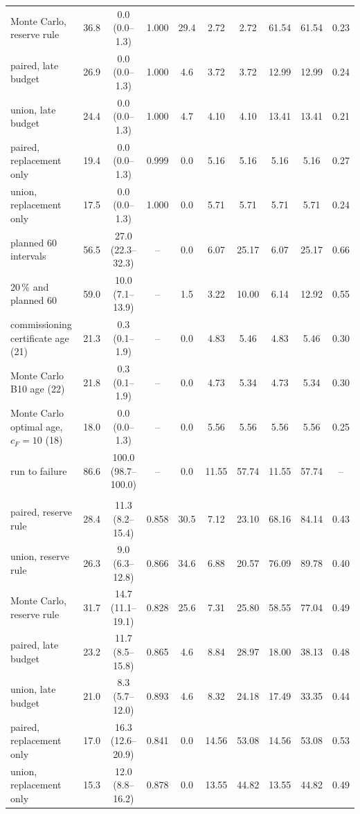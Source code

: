 \begin{table}[htbp]
\begin{tabular*}{\textwidth}{@{\extracolsep{\fill}}lccccccccc@{}}
Monte Carlo, reserve rule & 36.8 & 0.0 (0.0--1.3) & 1.000 & 29.4 & 2.72 & 2.72 & 61.54 & 61.54 & 0.23 \\
paired, late budget & 26.9 & 0.0 (0.0--1.3) & 1.000 & 4.6 & 3.72 & 3.72 & 12.99 & 12.99 & 0.24 \\
union, late budget & 24.4 & 0.0 (0.0--1.3) & 1.000 & 4.7 & 4.10 & 4.10 & 13.41 & 13.41 & 0.21 \\
paired, replacement only & 19.4 & 0.0 (0.0--1.3) & 0.999 & 0.0 & 5.16 & 5.16 & 5.16 & 5.16 & 0.27 \\
union, replacement only & 17.5 & 0.0 (0.0--1.3) & 1.000 & 0.0 & 5.71 & 5.71 & 5.71 & 5.71 & 0.24 \\
planned 60 intervals & 56.5 & 27.0 (22.3--32.3) & -- & 0.0 & 6.07 & 25.17 & 6.07 & 25.17 & 0.66 \\
20\,\% and planned 60 & 59.0 & 10.0 (7.1--13.9) & -- & 1.5 & 3.22 & 10.00 & 6.14 & 12.92 & 0.55 \\
commissioning certificate age (21) & 21.3 & 0.3 (0.1--1.9) & -- & 0.0 & 4.83 & 5.46 & 4.83 & 5.46 & 0.30 \\
Monte Carlo B10 age (22) & 21.8 & 0.3 (0.1--1.9) & -- & 0.0 & 4.73 & 5.34 & 4.73 & 5.34 & 0.30 \\
Monte Carlo optimal age, $c_F=10$ (18) & 18.0 & 0.0 (0.0--1.3) & -- & 0.0 & 5.56 & 5.56 & 5.56 & 5.56 & 0.25 \\
run to failure & 86.6 & 100.0 (98.7--100.0) & -- & 0.0 & 11.55 & 57.74 & 11.55 & 57.74 & -- \\
\addlinespace
\multicolumn{10}{@{}l}{\textit{beyond, coasting}} \\
paired, reserve rule & 28.4 & 11.3 (8.2--15.4) & 0.858 & 30.5 & 7.12 & 23.10 & 68.16 & 84.14 & 0.43 \\
union, reserve rule & 26.3 & 9.0 (6.3--12.8) & 0.866 & 34.6 & 6.88 & 20.57 & 76.09 & 89.78 & 0.40 \\
Monte Carlo, reserve rule & 31.7 & 14.7 (11.1--19.1) & 0.828 & 25.6 & 7.31 & 25.80 & 58.55 & 77.04 & 0.49 \\
paired, late budget & 23.2 & 11.7 (8.5--15.8) & 0.865 & 4.6 & 8.84 & 28.97 & 18.00 & 38.13 & 0.48 \\
union, late budget & 21.0 & 8.3 (5.7--12.0) & 0.893 & 4.6 & 8.32 & 24.18 & 17.49 & 33.35 & 0.44 \\
paired, replacement only & 17.0 & 16.3 (12.6--20.9) & 0.841 & 0.0 & 14.56 & 53.08 & 14.56 & 53.08 & 0.53 \\
union, replacement only & 15.3 & 12.0 (8.8--16.2) & 0.878 & 0.0 & 13.55 & 44.82 & 13.55 & 44.82 & 0.49 \\

\end{tabular*}
\end{table}
